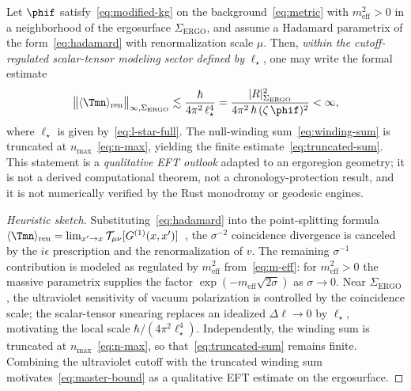 \begin{proposition}
\label{prop:bounded-Tren}
Let $\phif$ satisfy~\eqref{eq:modified-kg} on the background~\eqref{eq:metric}
with $m_{\mathrm{eff}}^{2}>0$ in a neighborhood of the ergosurface $\Sigma_{\mathrm{ERGO}}$,
and assume a Hadamard parametrix of the form~\eqref{eq:hadamard} with
renormalization scale $\mu$.
Then, \emph{within the cutoff-regulated scalar-tensor modeling sector defined by}
$\ell_{\star}$, one may write the formal estimate
\begin{equation}
\label{eq:master-bound}
\bigl\|
\langle\Tmn\rangle_{\mathrm{ren}}
\bigr\|_{\infty,\Sigma_{\mathrm{ERGO}}}
\lesssim
\frac{\hbar}{4\pi^{2}\,\ell_{\star}^{4}}
=
\frac{|R|_{\Sigma_{\mathrm{ERGO}}}^{2}}{4\pi^{2}\,\hbar\,(\zeta\,\phif)^{2}}
<\infty,
\end{equation}
where $\ell_{\star}$ is given by~\eqref{eq:l-star-full}.
The null-winding sum~\eqref{eq:winding-sum} is truncated at
$n_{\max}$~\eqref{eq:n-max}, yielding the finite estimate~\eqref{eq:truncated-sum}.
This statement is a \emph{qualitative EFT outlook} adapted to an ergoregion geometry;
it is not a derived computational theorem, not a chronology-protection result, and it is
not numerically verified by the Rust monodromy or geodesic engines.
\end{proposition}

\begin{proof}[Heuristic sketch]
Substituting~\eqref{eq:hadamard} into the point-splitting formula
$\langle\Tmn\rangle_{\mathrm{ren}}=\lim_{x'\to x}
\mathcal{T}_{\mu\nu}[G^{(1)}(x,x')]$~\cite{BirrellDavies1982},
the $\sigma^{-2}$ coincidence divergence is canceled by the
$i\epsilon$ prescription and the renormalization of $v$.
The remaining $\sigma^{-1}$ contribution is modeled as regulated by
$m_{\mathrm{eff}}^{2}$ from~\eqref{eq:m-eff}: for $m_{\mathrm{eff}}^{2}>0$
the massive parametrix supplies the factor
$\exp(-m_{\mathrm{eff}}\sqrt{2\sigma})$ as $\sigma\to 0$.
Near $\Sigma_{\mathrm{ERGO}}$, the ultraviolet sensitivity of vacuum polarization
is controlled by the coincidence scale; the scalar-tensor smearing replaces
an idealized $\Delta\ell\to 0$ by $\ell_{\star}$, motivating the local
scale $\hbar/(4\pi^{2}\ell_{\star}^{4})$.
Independently, the winding sum is truncated at $n_{\max}$~\eqref{eq:n-max},
so that~\eqref{eq:truncated-sum} remains finite.
Combining the ultraviolet cutoff with the truncated winding sum
motivates~\eqref{eq:master-bound} as a qualitative EFT estimate on the ergosurface.
\end{proof}

